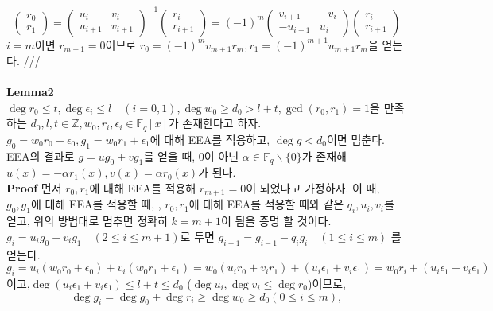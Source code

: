\documentclass[11pt]{article}
\begin{document}
\begin{displaymath}
\begin{pmatrix}r_{0}\\ r_{1}\end{pmatrix}=\begin{pmatrix}u_{i}&v_{i}\\ u_{i+1}&v_{i+1}\end{pmatrix}^{-1}\begin{pmatrix}r_{i}\\ r_{i+1}\end{pmatrix}
=(-1)^{m}\begin{pmatrix}v_{i+1}&-v_{i}\\ -u_{i+1}&u_{i}\end{pmatrix}\begin{pmatrix}r_{i}\\ r_{i+1}\end{pmatrix}
\end{displaymath}
$i=m$이면 $r_{m+1}=0$이므로 $r_{0}=(-1)^{m}v_{m+1}r_{m}, r_1=(-1)^{m+1}u_{m+1}r_{m}$을 얻는다. ///\\\\
\textbf{Lemma2} $\deg r_{0}\leq t, \deg \epsilon_{i} \leq l\quad (i=0,1),\deg w_{0}\geq d_{0}>l+t,\gcd(r_{0},r_{1})=1$을 만족하는 $d_{0},l,t\in\mathbb{Z},w_{0},r_{i},\epsilon_{i}\in \mathbb{F}_{q}[x]$가 존재한다고 하자. $g_{0}=w_{0}r_{0}+\epsilon_{0},g_{1}=w_{0}r_{1}+\epsilon_{1}$에 대해 EEA를 적용하고, $\deg g<d_{0}$이면 멈춘다. EEA의 결과로 $g=ug_{0}+vg_{1}$를 얻을 때, $0$이 아닌 $\alpha\in\mathbb{F}_{q}\backslash\{0\}$가 존재해 $u(x)=-\alpha r_{1}(x),v(x)=\alpha r_{0}(x)$가 된다.\\
\textbf{Proof} 먼저 $r_{0},r_{1}$에 대해 EEA를 적용해 $r_{m+1}=0$이 되었다고 가정하자. 이 때, $g_{0},g_{1}$에 대해 EEA를 적용할 때, , $r_{0},r_{1}$에 대해 EEA를 적용할 때와 같은 $q_{i},u_{i},v_{i}$를 얻고, 위의 방법대로 멈추면 정확히 $k=m+1$이 됨을 증명 할 것이다.\\
$g_{i}=u_{i}g_{0}+v_{i}g_{1}\quad(2\leq i\leq m+1)$로 두면 $g_{i+1}=g_{i-1}-q_{i}g_{i}\quad(1\leq i\leq m)$ 를 얻는다.
\begin{displaymath}
g_{i}=u_{i}(w_{0}r_{0}+\epsilon_{0})+v_{i}(w_{0}r_{1}+\epsilon_{1})=w_{0}(u_{i}r_{0}+v_{i}r_{1})+(u_{i}\epsilon_{1}+v_{i}\epsilon_{1})=w_{0}r_{i}+(u_{i}\epsilon_{1}+v_{i}\epsilon_{1})
\end{displaymath}
이고,$\deg(u_{i}\epsilon_{1}+v_{i}\epsilon_{1})\leq l+t\leq d_{0}$ ($\deg u_{i},\deg v_{i}\leq \deg{r_0}$)이므로, 
\begin{displaymath}
\deg g_{i} = \deg g_{0}+\deg r_{i}\geq \deg w_{0} \geq d_{0}(0\leq i\leq m),
\end{displaymath}
\end{document}
